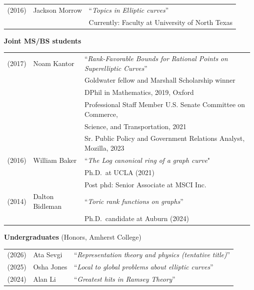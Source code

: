 \documentclass[margin,line]{res}
\newcommand{\defi}[1]{\textsf{#1}} 				%
\begin{document}
\begin{resume}
\begin{tabular}{lll}
  (2016) &  Jackson Morrow & ``\emph{Topics in Elliptic curves}'' \\
  & & Currently: Faculty at University of North Texas
\end{tabular}

  
{\bf Joint MS/BS students}
\vspace*{-.15in}

\begin{tabular}{lll}
  (2017) & \defi{Noam Kantor} & ``\emph{Rank-Favorable Bounds for Rational Points on Superelliptic Curves}'' \\
         &&   Goldwater fellow and Marshall Scholarship winner \\
         &&  DPhil in Mathematics, 2019,  Oxford \\
         &&  Professional Staff Member U.S. Senate Committee on Commerce,\\
         &&  \hspace{3pt} Science, and Transportation, 2021   \\
         &&  Sr. Public Policy and Government Relations Analyst, Mozilla, 2023   \\   
  (2016) & \defi{William Baker} & ``\emph{The Log canonical ring of a graph curve}" \\
         &&    Ph.D.~at UCLA (2021)\\
         &&    Post phd: Senior Associate at MSCI Inc.\\
  (2014) & \defi{Dalton Bidleman} & ``\emph{Toric rank functions on graphs}'' \\
  && Ph.D.~candidate at Auburn (2024)\\

\end{tabular}


{\bf Undergraduates} (Honors, Amherst College)
\vspace*{-.15in}

\begin{tabular}{lll}
  (2026) & \defi{Ata Sevgi} & ``\emph{Representation theory and physics (tentative title)}''\\    
  (2025) & \defi{Osha Jones} & ``\emph{Local to global problems about elliptic curves}''\\
  (2024) & \defi{Alan Li} & ``\emph{Greatest hits in Ramsey Theory}''
\end{tabular}


\end{resume}
\end{document}
